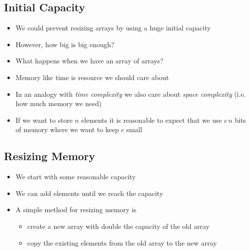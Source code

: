 \begin{slide}
\section{Initial Capacity}

\begin{PauseHighLight}
  \begin{itemize}
  \item We could prevent resizing arrays by using a huge initial
    capacity\pause
  \item However, how big is big enough?\pause
  \item What happens when we have an array of arrays?\pause
  \item Memory like time is resource we should care about\pause
  \item In an analogy with \emph{time complexity} we also care about
    \emph{space complexity} (i.e. how much memory we need)\pause
  \item If we want to store $n$ elements it is reasonable to expect that
    we use $c\, n$ bits of memory where we want to keep $c$ small\pause
  \end{itemize}
\end{PauseHighLight}
\end{slide}



\begin{slide}
\section{Resizing Memory}

\pausebuild
\begin{itemize}
\item We start with some reasonable capacity\pause
\item We can add elements\pause{} 
  until we reach the capacity\pause
\item A simple method for resizing memory is
  \begin{itemize}
  \item create a new array with double the capacity of the old
    array\pause 
  \item copy the existing elements from the old array to the new
    array\pause
  \end{itemize}
\end{itemize}
\begin{center}
  \pause
\end{center}
\end{slide}



